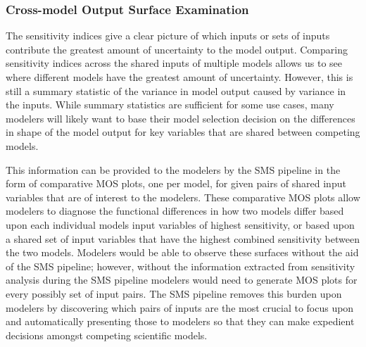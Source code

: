 \subsubsection{Cross-model Output Surface Examination \label{sec:multi_mod_surface}}
The sensitivity indices give a clear picture of which inputs or sets of inputs contribute the greatest amount of uncertainty to the model output.
Comparing sensitivity indices across the shared inputs of multiple models allows us to see where different models have the greatest amount of uncertainty.
However, this is still a summary statistic of the variance in model output caused by variance in the inputs.
While summary statistics are sufficient for some use cases, many modelers will likely want to base their model selection decision on the differences in shape of the model output for key variables that are shared between competing models.

This information can be provided to the modelers by the SMS pipeline in the form of comparative MOS plots, one per model, for given pairs of shared input variables that are of interest to the modelers.
These comparative MOS plots allow modelers to diagnose the functional differences in how two models differ based upon each individual models input variables of highest sensitivity, or based upon a shared set of input variables that have the highest combined sensitivity between the two models.
Modelers would be able to observe these surfaces without the aid of the SMS pipeline; however, without the information extracted from sensitivity analysis during the SMS pipeline modelers would need to generate MOS plots for every possibly set of input pairs.
The SMS pipeline removes this burden upon modelers by discovering which pairs of inputs are the most crucial to focus upon and automatically presenting those to modelers so that they can make expedient decisions amongst competing scientific models.
